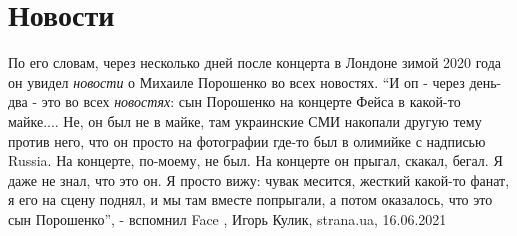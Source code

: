  
 
 
 
 
\chapter{Новости}
\label{sec:slova.novosti}

По его словам, через несколько дней после концерта в Лондоне зимой 2020 года он
увидел \emph{новости} о Михаиле Порошенко во всех новостях.  \enquote{И оп - через день-два -
это во всех \emph{новостях}: сын Порошенко на концерте Фейса в какой-то майке.... Не,
он был не в майке, там украинские СМИ накопали другую тему против него, что он
просто на фотографии где-то был в олимийке с надписью Russia. На концерте,
по-моему, не был. На концерте он прыгал, скакал, бегал. Я даже не знал, что это
он. Я просто вижу: чувак месится, жесткий какой-то фанат, я его на сцену
поднял, и мы там вместе попрыгали, а потом оказалось, что это сын Порошенко}, -
вспомнил Face
, 
Игорь Кулик, strana.ua, 16.06.2021

